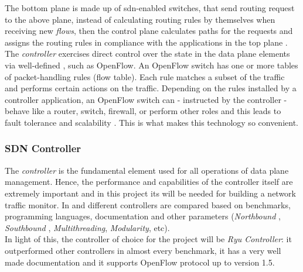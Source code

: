 \noindent The bottom plane is made up of \gls{sdn}-enabled switches, that send routing request to the above plane, instead of calculating routing rules by themselves when receiving new \textit{flows}, then the control plane calculates paths for the requests and assigns the routing rules in compliance with the applications in the top plane \cite{Xu2017}. The \textit{controller} exercises direct control over the state in the data plane elements via well-defined , such as OpenFlow. An OpenFlow switch has one or more tables of packet-handling rules (flow table). Each rule matches a subset of the traffic and performs certain actions on the traffic. Depending on the rules installed by a controller application, an OpenFlow switch can - instructed by the controller - behave like a router, switch, firewall, or perform other roles and this leads to fault tolerance and scalability \cite{Lantz2015}. This is what makes this technology so convenient.


\subsubsection{SDN Controller}
\label{subsubsec:sdn-controller}

The \textit{controller} is the fundamental element used for all operations of data plane management. Hence, the performance and capabilities of the controller itself are extremely important and in this project its  will be needed for building a network traffic monitor. In \cite{Bondkovskii2016} and \cite{Zhu2019} different controllers are compared based on benchmarks, programming languages, documentation and other parameters (\textit{Northbound }, \textit{Southbound }, \textit{Multithreading}, \textit{Modularity}, etc). \\ In light of this, the controller of choice for the project will be \textit{Ryu Controller}: it outperformed other controllers in almost every benchmark, it has a very well made documentation \cite{RyuDoc} and it supports OpenFlow protocol up to version 1.5.


